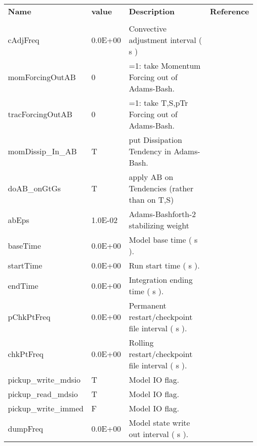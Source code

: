 \newpage
\begin{table}
\begin{tabular}{lllc}

  \textbf{Name}  &  \textbf{value}  
    &  \textbf{Description}   &  \textbf{Reference}  \\
  & & & \\
   cAdjFreq   &                   0.0E+00
    &   Convective adjustment interval ( s ) 
    &  %
    \\
   momForcingOutAB   &                         0
    &   =1: take Momentum Forcing out of Adams-Bash.
    &  %
    \\
   tracForcingOutAB   &                         0
    &   =1: take T,S,pTr Forcing out of Adams-Bash.
    &  %
    \\
   momDissip\_In\_AB   &                     T
    &   put Dissipation Tendency in Adams-Bash. 
    &  %
    \\
   doAB\_onGtGs   &                     T
    &   apply AB on Tendencies (rather than on T,S)
    &  %
    \\
   abEps   &                   1.0E-02
    &   Adams-Bashforth-2 stabilizing weight 
    &  %
    \\
   baseTime   &                   0.0E+00
    &   Model base time ( s ). 
    &  %
    \\
   startTime   &                   0.0E+00
    &   Run start time ( s ). 
    &  %
    \\
   endTime   &                   0.0E+00
    &   Integration ending time ( s ). 
    &  %
    \\
   pChkPtFreq   &                   0.0E+00
    &   Permanent restart/checkpoint file interval ( s ). 
    &  %
    \\
   chkPtFreq   &                   0.0E+00
    &   Rolling restart/checkpoint file interval ( s ). 
    &  %
    \\
   pickup\_write\_mdsio   &                     T
    &   Model IO flag. 
    &  %
    \\
   pickup\_read\_mdsio   &                     T
    &   Model IO flag. 
    &  %
    \\
   pickup\_write\_immed   &                     F
    &   Model IO flag. 
    &  %
    \\
   dumpFreq   &                   0.0E+00
    &   Model state write out interval ( s ). 

\end{tabular}
\end{table}
